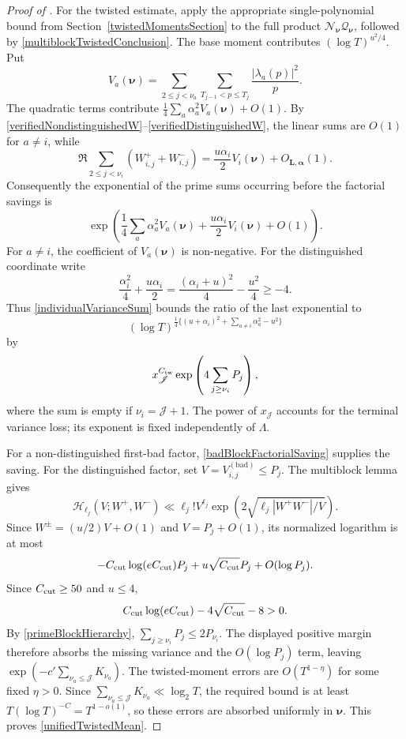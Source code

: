 \documentclass[oneside, 12pt]{amsart}
\theoremstyle{definition}
\begin{document}
{\begin{proof}[Proof of ]
			For the twisted estimate, apply the appropriate single-polynomial
			bound from Section~\ref{twistedMomentsSection} to the full product
			$\mathcal N_{\boldsymbol\nu}\mathcal Q_{\boldsymbol\nu}$, followed by
			\eqref{multiblockTwistedConclusion}.
			The base moment contributes $(\log T)^{u^2/4}$.  Put
			\[
			V_a(\boldsymbol\nu)=
			\sum_{2\leq j<\nu_a}
			\sum_{T_{j-1}<p\leq T_j}\frac{|\lambda_a(p)|^2}{p}.
			\]
			The quadratic terms contribute
			$\frac14\sum_a\alpha_a^2V_a(\boldsymbol\nu)+O(1)$.
			By \eqref{verifiedNondistinguishedW}--\eqref{verifiedDistinguishedW},
			the linear sums are $O(1)$ for $a\ne i$, while
			\begin{equation}\label{distinguishedLinearTermsApplication}
				\Re\sum_{2\leq j<\nu_i}(W_{i,j}^++W_{i,j}^-)
				=\frac{u\alpha_i}{2}V_i(\boldsymbol\nu)+O_{\boldsymbol L,
					\boldsymbol\alpha}(1).
			\end{equation}
			Consequently the exponential of
			the prime sums occurring before the factorial savings is
			\[
			\exp\left(
			\frac14\sum_a\alpha_a^2V_a(\boldsymbol\nu)
			+\frac{u\alpha_i}{2}V_i(\boldsymbol\nu)+O(1)
			\right).
			\]
			For $a\neq i$, the coefficient of $V_a(\boldsymbol\nu)$ is
			non-negative.  For the distinguished coordinate write
			\[
			\frac{\alpha_i^2}{4}+\frac{u\alpha_i}{2}
			=\frac{(\alpha_i+u)^2}{4}-\frac{u^2}{4}\geq-4.
			\]
			Thus \eqref{individualVarianceSum} bounds the ratio of the last
			exponential to
			\[
			(\log T)^{\frac14\{(u+\alpha_i)^2+
				\sum_{a\neq i}\alpha_a^2-u^2\}}
			\]
			by
			\[
			x_{\mathscr J}^{C_{\rm tw}}
			\exp\left(4\sum_{j\geq\nu_i}P_j\right),
			\]
			where the sum is empty if $\nu_i=\mathscr J+1$.
			The power of $x_{\mathscr J}$ accounts for the terminal variance
			loss; its exponent is fixed independently of $\Lambda$.
			
			For a non-distinguished first-bad factor,
			\eqref{badBlockFactorialSaving} supplies the saving.  For the
			distinguished factor, set
			$V=V_{i,j}^{(\mathrm{bad})}\leq P_j$.  The multiblock lemma gives
			\[
			\mathcal H_{\ell_j}(V;W^+,W^-)
			\ll \ell_j! V^{\ell_j}
			\exp\left(2\sqrt{\ell_j|W^+W^-|/V}\right).
			\]
			Since $W^\pm=(u/2)V+O(1)$ and $V=P_j+O(1)$, its normalized
			logarithm is at most
			\[
			-C_{\rm cut}\log(eC_{\rm cut})P_j
			+u\sqrt{C_{\rm cut}}P_j+O(\log P_j).
			\]
			Since $C_{\rm cut}\geq50$ and $u\leq4$,
			\[
			C_{\rm cut}\log(eC_{\rm cut})-4\sqrt{C_{\rm cut}}-8>0.
			\]
			By \eqref{primeBlockHierarchy},
			$\sum_{j\geq\nu_i}P_j\leq2P_{\nu_i}$.
			The displayed positive margin therefore absorbs the missing variance
			and the $O(\log P_j)$ term, leaving
			$\exp(-c'\sum_{\nu_a\leq\mathscr J}K_{\nu_a})$.
			The twisted-moment errors are $O(T^{1-\eta})$ for some fixed $\eta>0$.
			Since $\sum_{\nu_a\leq\mathscr J}K_{\nu_a}\ll\log_2T$, the required
			bound is at least $T(\log T)^{-C}=T^{1-o(1)}$, so these errors are
			absorbed uniformly in $\boldsymbol\nu$.  This proves
			\eqref{unifiedTwistedMean}.
		\end{proof}
		
}
\end{document}
